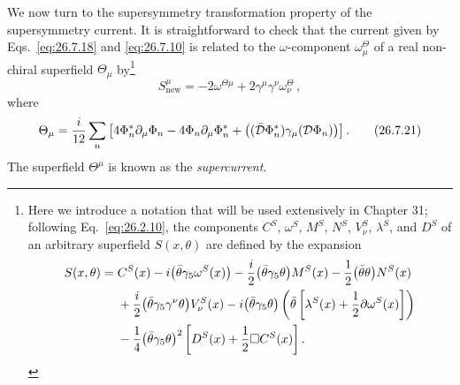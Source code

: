 We now turn to the supersymmetry transformation property of the
supersymmetry current. It is straightforward to check that the current given
by Eqs.~\eqref{eq:26.7.18} and \eqref{eq:26.7.10} is related to the
\(\omega\)-component \(\omega_\mu^\Theta\) of a real non-chiral superfield
\(\Theta_\mu\) by\footnote{Here we introduce a notation that will be used
extensively in Chapter 31; following Eq.~\eqref{eq:26.2.10}, the components
\(C^S\), \(\omega^S\), \(M^S\), \(N^S\), \(V_\nu^S\), \(\lambda^S\), and
\(D^S\) of an arbitrary superfield \(S(x,\theta)\) are defined by the
expansion
\[
  \begin{aligned}
  S(x,\theta)={}&C^S(x)-i\bigl(\bar\theta\gamma_5\omega^S(x)\bigr)
  -\frac{i}{2}\bigl(\bar\theta\gamma_5\theta\bigr)M^S(x)
  -\frac12\bigl(\bar\theta\theta\bigr)N^S(x)
  \\
  &+\frac{i}{2}\bigl(\bar\theta\gamma_5\gamma^\nu\theta\bigr)V_\nu^S(x)
  -i\bigl(\bar\theta\gamma_5\theta\bigr)
   \left(
    \bar\theta\left[\lambda^S(x)+\frac12\sl{\partial}\omega^S(x)\right]
   \right)
  \\
  &-\frac14\bigl(\bar\theta\gamma_5\theta\bigr)^2
   \left[D^S(x)+\frac12\Box C^S(x)\right].
  \end{aligned}
\]}
\begin{equation}
  S_{\mathrm{new}}^\mu
  =-2\omega^{\Theta\mu}
   +2\gamma^\mu\gamma^\nu\omega_\nu^\Theta\,,
  \tag{26.7.20}\label{eq:26.7.20}
\end{equation}
where
\begin{equation}
  \Theta_\mu
  =\frac{i}{12}\sum_n\left[
    4\Phi_n^*\partial_\mu\Phi_n
    -4\Phi_n\partial_\mu\Phi_n^*
    +\bigl((\bar{\mathcal{D}}\Phi_n^*)\gamma_\mu(\mathcal{D}\Phi_n)\bigr)
  \right].
  \tag{26.7.21}\label{eq:26.7.21}
\end{equation}
The superfield \(\Theta^\mu\) is known as the \emph{supercurrent}.

